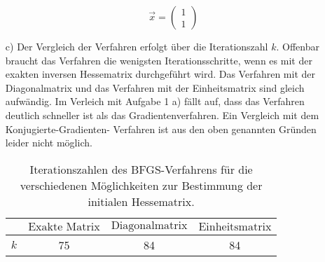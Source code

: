 \begin{itemize}[leftmargin=*]
          \begin{equation*}
            \vec{x} = \begin{pmatrix}
              1 \\
              1
          \end{pmatrix}
          \end{equation*}
\item[c)] Der Vergleich der Verfahren erfolgt über die Iterationszahl $k$.
          Offenbar braucht das Verfahren die wenigsten Iterationsschritte, wenn es mit der exakten inversen
          Hessematrix durchgeführt wird. Das Verfahren mit der Diagonalmatrix und das Verfahren mit der Einheitsmatrix sind gleich aufwändig. Im Verleich mit Aufgabe 1 a) fällt auf, dass das Verfahren
          deutlich schneller ist als das Gradientenverfahren. Ein Vergleich mit dem Konjugierte-Gradienten-
          Verfahren ist aus den oben genannten Gründen leider nicht möglich.
          \FloatBarrier
          \begin{table}[h]
              \centering
          		\label{tab:tab1}
          		\caption{Iterationszahlen des BFGS-Verfahrens für die verschiedenen Möglichkeiten zur Bestimmung der initialen Hessematrix.}
              \begin{tabular}{c c c c}
                  \toprule
          				$ $ & $\text{Exakte Matrix}$ & $\text{Diagonalmatrix}$ & $\text{Einheitsmatrix}$ \\
          				\midrule
                  $k$ & 75 & 84 & 84 \\
                  \bottomrule
              \end{tabular}
          \end{table}
          \FloatBarrier
          \noindent
\end{itemize}


